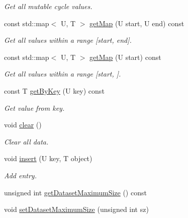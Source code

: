 \begin{DoxyCompactItemize}
\begin{DoxyCompactList}\small\item\em \-Get all mutable cycle values. \end{DoxyCompactList}\item 
const std\-::map$<$ \-U, \-T $>$ \hyperlink{classcryomesh_1_1dataobjects_1_1DataObject_a8e13c80d428064a1df4102da310c7836}{get\-Map} (\-U start, \-U end) const 
\begin{DoxyCompactList}\small\item\em \-Get all values within a range \mbox{[}start, end\mbox{]}. \end{DoxyCompactList}\item 
const std\-::map$<$ \-U, \-T $>$ \hyperlink{classcryomesh_1_1dataobjects_1_1DataObject_a04d86549f1cda29465e548fa3776fea6}{get\-Map} (\-U start) const 
\begin{DoxyCompactList}\small\item\em \-Get all values within a range \mbox{[}start, \mbox{]}. \end{DoxyCompactList}\item 
const \-T \hyperlink{classcryomesh_1_1dataobjects_1_1DataObject_a186b4e6a80bdf6a6d26c65e00c8aa547}{get\-By\-Key} (\-U key) const 
\begin{DoxyCompactList}\small\item\em \-Get value from key. \end{DoxyCompactList}\item 
void \hyperlink{classcryomesh_1_1dataobjects_1_1DataObject_a55ad9c772c8b174af40cbb530cf5fade}{clear} ()
\begin{DoxyCompactList}\small\item\em \-Clear all data. \end{DoxyCompactList}\item 
void \hyperlink{classcryomesh_1_1dataobjects_1_1DataObject_a7e57af8afd265116b13b027cc9ab6c52}{insert} (\-U key, \-T object)
\begin{DoxyCompactList}\small\item\em \-Add entry. \end{DoxyCompactList}\item 
unsigned int \hyperlink{classcryomesh_1_1dataobjects_1_1DataObject_a4b98ff0b286059f8c2cbe8277bfd3e02}{get\-Dataset\-Maximum\-Size} () const 
\item 
void \hyperlink{classcryomesh_1_1dataobjects_1_1DataObject_acdbdebc4d83ea9bde080ecf15a3ec6c6}{set\-Dataset\-Maximum\-Size} (unsigned int sz)
\item 

\end{DoxyCompactItemize}
